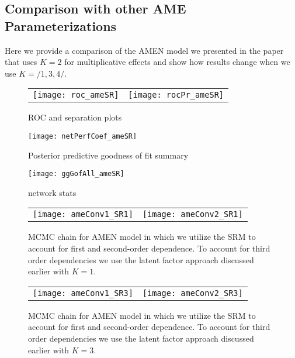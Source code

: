 \subsection{Comparison with other AME Parameterizations}

Here we provide a comparison of the AMEN model we presented in the paper that uses $K=2$ for multiplicative effects and show how results change when we use $K=/{1,3,4/}$. 



\begin{figure}[ht]
	\centering
	\begin{tabular}{cc}
	\texttt{[image: roc\_ameSR]} & 
	\texttt{[image: rocPr\_ameSR]}
	\end{tabular}
	\caption{ROC and separation plots}
	\label{fig:roc_latentSpace}
\end{figure}

\begin{figure}[ht]
	\centering
	\texttt{[image: netPerfCoef\_ameSR]}
	\caption{Posterior predictive goodness of fit summary}
	\label{fig:netPerfCoef_ameSR}
\end{figure}

\begin{figure}[ht]
	\centering
	\texttt{[image: ggGofAll\_ameSR]}
	\caption{network stats }
	\label{fig:gofAll_ameSR}
\end{figure}
\FloatBarrier

\newpage
\begin{figure}[ht]
	\centering
	\begin{tabular}{cc}
	\texttt{[image: ameConv1\_SR1]} &
	\texttt{[image: ameConv2\_SR1]}
	\end{tabular}
	\caption{MCMC chain for AMEN model in which we utilize the SRM to account for first and second-order dependence. To account for third order dependencies we use the latent factor approach discussed earlier with $K=1$.}
	\label{fig:ameConv}
\end{figure}

\begin{figure}[ht]
	\centering
	\begin{tabular}{cc}
	\texttt{[image: ameConv1\_SR3]} &
	\texttt{[image: ameConv2\_SR3]}
	\end{tabular}
	\caption{MCMC chain for AMEN model in which we utilize the SRM to account for first and second-order dependence. To account for third order dependencies we use the latent factor approach discussed earlier with $K=3$.}
	\label{fig:ameConv}
\end{figure}
\FloatBarrier

